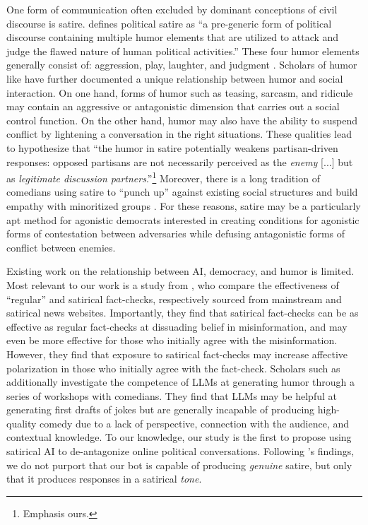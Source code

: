 One form of communication often excluded by dominant conceptions of civil discourse is satire.
\citet{Holbert2015PoliticalSatire} defines political satire as ``a pre-generic form of political discourse containing multiple humor elements that are utilized to attack and judge the flawed nature of human political activities.'' These four humor elements generally consist of: aggression, play, laughter, and judgment \cite{Holbert2015PoliticalSatire}. Scholars of humor like \citet{NorrickAndSpitz2008HumorAsAResource} have further documented a unique relationship between humor and social interaction. On one hand, forms of humor such as teasing, sarcasm, and ridicule may contain an aggressive or antagonistic dimension that carries out a social control function. On the other hand, humor may also have the ability to suspend conflict by lightening a conversation in the right situations. These qualities lead \citet{BoukesAndHameleers2023FactsOrHumor} to hypothesize that ``the humor in satire potentially weakens partisan-driven responses: opposed partisans are not necessarily perceived as the \textit{enemy} [...] but as \textit{legitimate discussion partners}.''\footnote{Emphasis ours.} Moreover, there is a long tradition of comedians using satire to ``punch up'' against existing social structures and build empathy with minoritized groups \cite{Mirowskietal2024LMsComedy}. For these reasons, satire may be a particularly apt method for agonistic democrats interested in creating conditions for agonistic forms of contestation between adversaries while defusing antagonistic forms of conflict between enemies.

Existing work on the relationship between AI, democracy, and humor is limited. Most relevant to our work is a study from \citet{BoukesAndHameleers2023FactsOrHumor}, who compare the effectiveness of ``regular'' and satirical fact-checks, respectively sourced from mainstream and satirical news websites. Importantly, they find that satirical fact-checks can be as effective as regular fact-checks at dissuading belief in misinformation, and may even be more effective for those who initially agree with the misinformation. However, they find that exposure to satirical fact-checks may increase affective polarization in those who initially agree with the fact-check. Scholars such as \citet{Mirowskietal2024LMsComedy} additionally investigate the competence of LLMs at generating humor through a series of workshops with comedians. They find that LLMs may be helpful at generating first drafts of jokes but are generally incapable of producing high-quality comedy due to a lack of perspective, connection with the audience, and contextual knowledge. To our knowledge, our study is the first to propose using satirical AI to de-antagonize online political conversations. Following \citet{Mirowskietal2024LMsComedy}'s findings, we do not purport that our bot is capable of producing \textit{genuine} satire, but only that it produces responses in a satirical \textit{tone}.